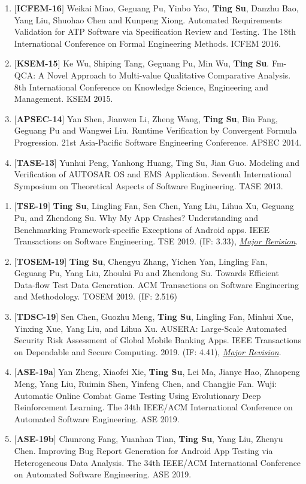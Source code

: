 \documentclass[margin]{res}
\begin{document}
\begin{resume}
\begin{enumerate}[leftmargin=*]
    \item $[$\textbf{ICFEM-16}$]$ Weikai Miao, Geguang Pu, Yinbo Yao, \textbf{Ting Su}, Danzhu Bao, Yang Liu, Shuohao Chen and Kunpeng Xiong. Automated Requirements Validation for ATP Software via Specification Review and Testing. The 18th International Conference on Formal Engineering Methods. ICFEM 2016. 
    \item $[$\textbf{KSEM-15}$]$ Ke Wu, Shiping Tang, Geguang Pu, Min Wu, \textbf{Ting Su}. Fm-QCA: A Novel Approach to Multi-value Qualitative Comparative Analysis. 8th International Conference on Knowledge Science, Engineering and Management. KSEM 2015. 
    \item $[$\textbf{APSEC-14}$]$ Yan Shen, Jianwen Li, Zheng Wang, \textbf{Ting Su}, Bin Fang, Geguang Pu and Wangwei Liu. Runtime Verification by Convergent Formula Progression. 21st Asia-Pacific Software Engineering Conference. APSEC 2014. 
    \item $[$\textbf{TASE-13}$]$ Yunhui Peng, Yanhong Huang, Ting Su, Jian Guo. Modeling and Verification of AUTOSAR OS and EMS Application. Seventh International Symposium on Theoretical Aspects of Software Engineering. TASE 2013. 
\end{enumerate}

\begin{enumerate}[leftmargin=*]
    \item $[$\textbf{TSE-19}$]$ \textbf{Ting Su}, Lingling Fan, Sen Chen, Yang Liu, Lihua Xu, Geguang Pu, and Zhendong Su. Why My App Crashes? Understanding and Benchmarking Framework-specific Exceptions of Android apps. IEEE Transactions on Software Engineering. TSE 2019. (IF: 3.33), \emph{\underline{Major Revision}}.
    \item $[$\textbf{TOSEM-19}$]$ \textbf{Ting Su}, Chengyu Zhang, Yichen Yan, Lingling Fan, Geguang Pu, Yang Liu, Zhoulai Fu and Zhendong Su. Towards Efficient Data-flow Test Data Generation. ACM Transactions on Software Engineering and Methodology. TOSEM 2019. (IF: 2.516)
    \item $[$\textbf{TDSC-19}$]$ Sen Chen, Guozhu Meng, \textbf{Ting Su}, Lingling Fan, Minhui Xue, Yinxing Xue, Yang Liu, and Lihua Xu. AUSERA: Large-Scale Automated Security Risk Assessment of Global Mobile Banking Apps. IEEE Transactions on Dependable and Secure Computing. 2019. (IF: 4.41), \emph{\underline{Major Revision}}.
    \item $[$\textbf{ASE-19a}$]$ Yan Zheng, Xiaofei Xie, \textbf{Ting Su}, Lei Ma, Jianye Hao, Zhaopeng Meng, Yang Liu, Ruimin Shen, Yinfeng Chen, and Changjie Fan. Wuji: Automatic Online Combat Game Testing Using Evolutionary Deep Reinforcement Learning. The 34th IEEE/ACM International Conference on Automated Software Engineering. ASE 2019.
    \item $[$\textbf{ASE-19b}$]$ Chunrong Fang, Yuanhan Tian, \textbf{Ting Su}, Yang Liu, Zhenyu Chen. Improving Bug Report Generation for Android App Testing via Heterogeneous Data Analysis. The 34th IEEE/ACM International Conference on Automated Software Engineering. ASE 2019.
\end{enumerate}


\end{resume}
\end{document}
